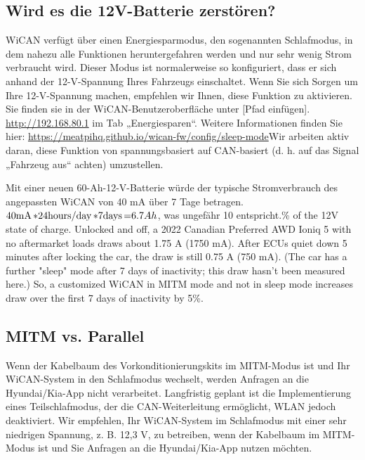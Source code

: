 \documentclass[superscriptaddress,onecolumn,floatfix]{revtex4-2}
\begin{document}
\subsection{Wird es die 12V-Batterie zerstören?}

WiCAN verfügt über einen Energiesparmodus, den sogenannten Schlafmodus, in dem nahezu alle Funktionen heruntergefahren werden und nur sehr wenig Strom verbraucht wird. Dieser Modus ist normalerweise so konfiguriert, dass er sich anhand der 12-V-Spannung Ihres Fahrzeugs einschaltet. Wenn Sie sich Sorgen um Ihre 12-V-Spannung machen, empfehlen wir Ihnen, diese Funktion zu aktivieren. Sie finden sie in der WiCAN-Benutzeroberfläche unter [Pfad einfügen]. \href{http://192.168.80.1}{http://192.168.80.1} im Tab „Energiesparen“. Weitere Informationen finden Sie hier: \href{https://meatpihq.github.io/wican-fw/config/sleep-mode}{https://meatpihq.github.io/wican-fw/config/sleep-mode}Wir arbeiten aktiv daran, diese Funktion von spannungsbasiert auf CAN-basiert (d. h. auf das Signal „Fahrzeug aus“ achten) umzustellen. 

Mit einer neuen 60-Ah-12-V-Batterie würde der typische Stromverbrauch des angepassten WiCAN von 40 mA über 7 Tage betragen. $40 \unit[\mathrm{mA}] * 24 \unit[\mathrm{hours/day}] * 7 \unit[\mathrm{days}] = 6.7 Ah$, was ungefähr 10 entspricht.\% of the 12V state of charge. Unlocked and off, a 2022 Canadian Preferred AWD Ioniq 5 with no aftermarket loads draws about 1.75 A (1750 mA). After ECUs quiet down 5 minutes after locking the car, the draw is still 0.75 A (750 mA). (The car has a further "sleep" mode after 7 days of inactivity; this draw hasn't been measured here.) So, a customized WiCAN in MITM mode and not in sleep mode increases draw over the first 7 days of inactivity by 5\%.

\subsection{MITM vs. Parallel}
Wenn der Kabelbaum des Vorkonditionierungskits im MITM-Modus ist und Ihr WiCAN-System in den Schlafmodus wechselt, werden Anfragen an die Hyundai/Kia-App nicht verarbeitet. Langfristig geplant ist die Implementierung eines Teilschlafmodus, der die CAN-Weiterleitung ermöglicht, WLAN jedoch deaktiviert. Wir empfehlen, Ihr WiCAN-System im Schlafmodus mit einer sehr niedrigen Spannung, z. B. 12,3 V, zu betreiben, wenn der Kabelbaum im MITM-Modus ist und Sie Anfragen an die Hyundai/Kia-App nutzen möchten. 
\end{document}
